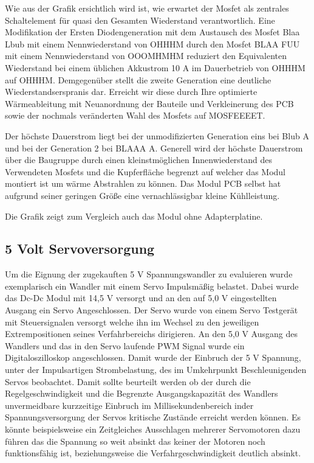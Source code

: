 Wie aus der Grafik ersichtlich wird ist, wie erwartet der Mosfet als zentrales Schaltelement für quasi den Gesamten Wiederstand verantwortlich.
Eine Modifikation der Ersten Diodengeneration mit dem Austausch des Mosfet  Blaa Lbub  mit einem Nennwiederstand von OHHHM durch den Mosfet  BLAA FUU mit einem Nennwiederstand von OOOMHMHM  reduziert den Equivalenten Wiederstand bei einem üblichen Akkustrom 10 A im Dauerbetrieb von OHHHM  auf OHHHM.
Demgegenüber stellt die zweite Generation eine deutliche Wiederstandserspranis dar.
Erreicht wir diese durch Ihre optimierte Wärmeableitung mit Neuanordnung der Bauteile und Verkleinerung des PCB sowie der nochmals veränderten Wahl des Mosfets auf MOSFEEEET.

Der höchste Dauerstrom liegt bei der unmodifizierten Generation eins bei  Blub A  und bei der Generation 2 bei BLAAA A. 
Generell wird der höchste Dauerstrom über die Baugruppe durch einen kleinstmöglichen Innenwiederstand des Verwendeten Mosfets und die Kupferfläche begrenzt auf welcher das Modul montiert ist um wärme Abstrahlen zu können. Das Modul PCB selbst hat aufgrund seiner geringen Größe eine vernachlässigbar kleine Kühlleistung.

Die Grafik zeigt zum Vergleich auch das Modul ohne Adapterplatine.

\subsection{5 Volt Servoversorgung}

Um die Eignung der zugekauften 5 V Spannungswandler zu evaluieren wurde exemplarisch ein Wandler mit einem Servo Impulsmäßig belastet.
Dabei wurde das Dc-Dc Modul mit 14,5 V versorgt und an den auf 5,0 V eingestellten Ausgang ein Servo Angeschlossen. Der Servo wurde von einem Servo Testgerät mit Steuersignalen versorgt welche ihn im Wechsel zu den jeweiligen Extrempositionen seines Verfahrbereichs dirigieren. 
An den 5,0 V Ausgang des Wandlers und das in den Servo laufende PWM Signal wurde ein  Digitaloszilloskop angeschlossen. Damit  wurde der Einbruch der 5 V Spannung, unter der Impulsartigen Strombelastung, des im Umkehrpunkt Beschleunigenden Servos beobachtet.
Damit sollte beurteilt werden ob der durch die Regelgeschwindigkeit und die Begrenzte Ausgangskapazität des Wandlers unvermeidbare kurzzeitige Einbruch im Millisekundenbereich inder Spannungsversorgung der Servos kritische Zustände erreicht werden können.
Es könnte beispielsweise ein Zeitgleiches Ausschlagen mehrerer Servomotoren dazu führen das die Spannung so weit absinkt das keiner der Motoren noch funktionsfähig ist, beziehungsweise die Verfahrgeschwindigkeit deutlich absinkt.

